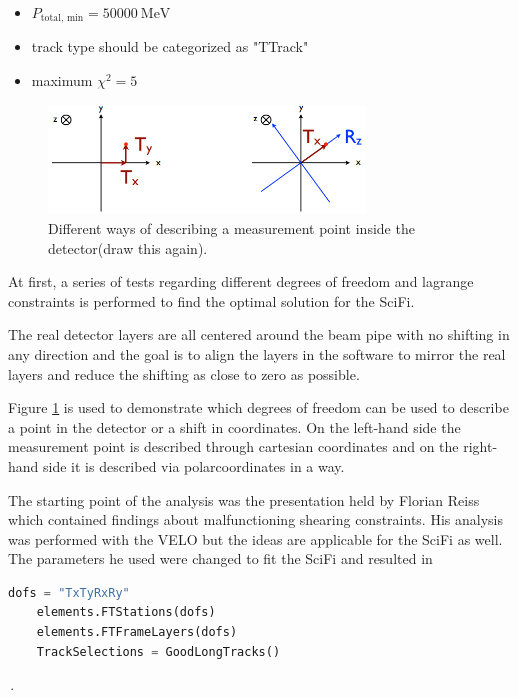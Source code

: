 \begin{itemize}
  \item $P_{\text{total, min}} = \SI{50000}{\mega\electronvolt}$
  \item track type should be categorized as "TTrack"
  \item maximum $\chi^2 = 5$
\end{itemize}

\begin{figure}
  \centering
  \includegraphics[width=0.75\textwidth]{plots/point_dofs.png}
  \caption{Different ways of describing a measurement point inside the detector(draw this again).}
  \label{fig:dofs}
\end{figure}

At first, a series of tests regarding different degrees of freedom and lagrange constraints is performed to find the optimal solution for the SciFi.

The real detector layers are all centered around the beam pipe with no shifting
in any direction and the goal is to align the layers in the software to mirror
the real layers and reduce the shifting as close to zero as possible.

Figure \ref{fig:dofs} is used to demonstrate which degrees of freedom can be used
to describe a point in the detector or a shift in coordinates.
On the left-hand side the measurement point is described through cartesian coordinates and on the right-hand side it is described via polarcoordinates in a way.

The starting point of the analysis was the presentation held by Florian
Reiss\cite{flo} which contained findings about malfunctioning shearing constraints.
His analysis was performed with the VELO but the ideas are applicable for the SciFi as well.
The parameters he used were changed to fit the SciFi and resulted in

\begin{lstlisting}[language=Python]
    dofs = "TxTyRxRy"
    elements.FTStations(dofs)
    elements.FTFrameLayers(dofs)
    TrackSelections = GoodLongTracks()
\end{lstlisting}\,.

